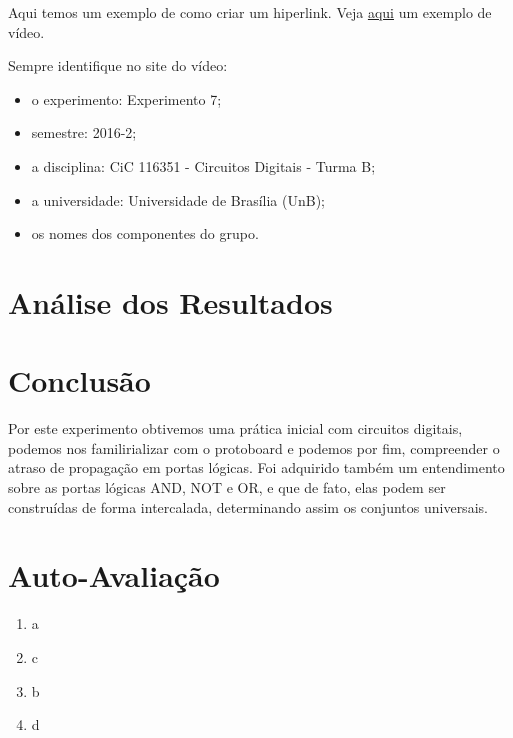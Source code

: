 \documentclass[12pt]{article}
\begin{document}
Aqui temos um exemplo de como criar um hiperlink. Veja
\href{https://www.youtube.com/watch?v=EcNxjxKRQ6E}{aqui} um exemplo de vídeo.

Sempre identifique no site do vídeo:
\begin{itemize}
    \item o experimento: Experimento 7;
    \item semestre: 2016-2;
    \item a disciplina: CiC 116351 - Circuitos Digitais - Turma B;
    \item a universidade: Universidade de Brasília (UnB);
    \item os nomes dos componentes do grupo.
\end{itemize}

\section{Análise dos Resultados}
\label{sec:Resultados}


\section{Conclusão}
\label{sec:Conclusao}
	Por este experimento obtivemos uma prática inicial com circuitos digitais, podemos nos familirializar com o protoboard e podemos por fim, compreender o atraso de propagação em portas  lógicas. 
	Foi adquirido também um entendimento sobre as portas lógicas AND, NOT e OR, e que de fato, elas podem ser construídas de forma intercalada, determinando assim os conjuntos universais.






\newpage 
\section*{Auto-Avaliação}

\begin{enumerate}
    \item a
    \item c
    \item b
    \item d
\end{enumerate}
\end{document}
